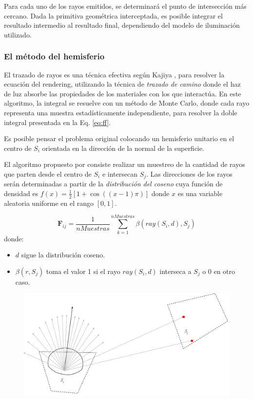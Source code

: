 Para cada uno de los rayos emitidos, se determinará el punto de intersección más cercano. Dada la primitiva geométrica interceptada, es posible integrar el resultado intermedio al resultado final, dependiendo del modelo de iluminación utilizado.

\subsubsection{El método del hemisferio}

El trazado de rayos es una técnica efectiva según Kajiya \cite{Kajiya}, para resolver la ecuación del rendering, utilizando la técnica de \textit{trazado de camino} donde el haz de luz absorbe las propiedades de los materiales con los que interactúa. En este algoritmo, la integral se resuelve con un método de Monte Carlo, donde cada rayo representa una muestra estadísticamente independiente, para resolver la doble integral presentada en la Eq. \eqref{eq:ff}.

Es posible pensar el problema original colocando un hemisferio unitario en el centro de $S_{i}$ orientada en la dirección de la normal de la superficie.

El algoritmo propuesto por \citeauthor{Malley} \cite{Malley} consiste realizar un muestreo de la cantidad de  rayos que parten desde el centro de $S_{i}$ e intersecan $S_{j}$. Las direcciones de los rayos serán determinadas a partir de la \textit{distribución del coseno} cuya función de densidad es $f(x) = \frac{1}{2}[1 + \cos((x-1)\pi)]$ donde $x$ es una variable aleatoria uniforme en el rango $[0,1]$.

\begin{equation}
	\mathbf{F}_{ij} = \frac{1}{nMuestras} \sum_{k=1}^{nMuestras} {\beta(ray(S_{i},d), S_{j})}
	\label{eq:ffhemiesfera}
\end{equation}
donde: \begin{itemize}
		\item  $d$ sigue la distribución coseno.
		\item $\beta(r, S_{j})$ toma el valor 1 si el rayo $ray(S_{i},d)$ interseca a $S_{j}$ o $0$ en otro caso.
	   \end{itemize}

\vspace{5mm}
\begin{figure}[htbp!]
	\centering
	\includegraphics[width=\linewidth]{assets/Raytracing}
	\label{img:ff}
\end{figure}

